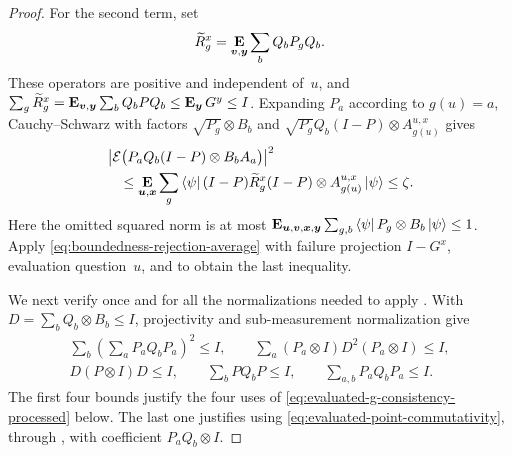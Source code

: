 \documentclass[11pt]{article}
\theoremstyle{definition}
\newcommand{\E}{\mathop{\bf E\/}}
\newcommand{\bu}{\boldsymbol{u}}
\newcommand{\bv}{\boldsymbol{v}}
\newcommand{\bx}{{\boldsymbol{x}}}
\newcommand{\by}{\boldsymbol{y}}
\begin{document}
\begin{proof}
For the second term, set
\[
 \widetilde R_g^x=\E_{\bv,\by}\sum_bQ_bP_gQ_b.
\]
These operators are positive and independent of~$u$, and
$\sum_g\widetilde R_g^x
=\E_{\bv,\by}\sum_bQ_bPQ_b\leq\E_{\by}G^y\leq I$.
Expanding $P_a$ according to $g(u)=a$, Cauchy--Schwarz with factors
$\sqrt{P_g}\otimes B_b$ and
$\sqrt{P_g}Q_b(I-P)\otimes A^{u,x}_{g(u)}$ gives
\begin{align}
&\left|\mathcal E\bigl(P_aQ_b(I-P)\otimes B_bA_a\bigr)\right|^2\nonumber\\
&\quad\leq
 \E_{\bu,\bx}\sum_g
   \bra\psi(I-P)\widetilde R_g^x(I-P)
   \otimes A^{u,x}_{g(u)}\ket\psi
 \leq\zeta.\label{eq:evaluated-g-second-leakage}
\end{align}
Here the omitted squared norm is at most
$\E_{\bu,\bv,\bx,\by}\sum_{g,b}
\bra\psi P_g\otimes B_b\ket\psi\leq1$.
Apply \eqref{eq:boundedness-rejection-average} with failure projection
$I-G^x$, evaluation question~$u$, and
 to obtain the last inequality.

We next verify once and for all the normalizations needed to apply
.  With
$D=\sum_bQ_b\otimes B_b\leq I$, projectivity and
sub-measurement normalization give
\begin{gather}
 \sum_b\left(\sum_aP_aQ_bP_a\right)^2\leq I,
 \qquad
 \sum_a(P_a\otimes I)D^2(P_a\otimes I)\leq I,\nonumber\\
 D(P\otimes I)D\leq I,
 \qquad
 \sum_bPQ_bP\leq I,
 \qquad
 \sum_{a,b}P_aQ_bP_a\leq I.\label{eq:evaluated-g-normalizations}
\end{gather}
The first four bounds justify the four uses of
\eqref{eq:evaluated-g-consistency-processed} below.  The last one
justifies using \eqref{eq:evaluated-point-commutativity}, through
, with coefficient $P_aQ_b\otimes I$.


\end{proof}
\end{document}
